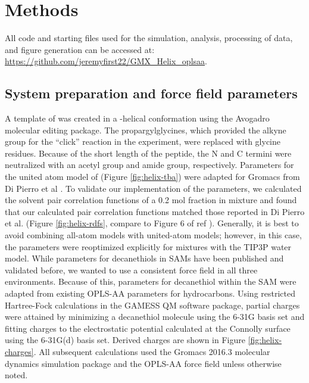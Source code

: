 \section{Methods}\label{helix-methods}

All code and starting files used for the simulation, analysis, processing of data, and figure generation can be accessed at: 
\url{https://github.com/jeremyfirst22/GMX_Helix_oplsaa}. 

\subsection{System preparation and force field parameters}

A template of \pep{} was created in a \textalpha{}-helical conformation using the Avogadro molecular editing package\cite{Hanwell2012}.
The propargylglycines, which provided the alkyne group for the ``click'' reaction in the experiment, were replaced with glycine residues. 
Because of the short length of the peptide, the N and C termini were neutralized with an acetyl group and amide group, respectively. 
Parameters for the united atom model of \tba{} (Figure \ref{fig:helix-tba}) were adapted for Gromacs from Di Pierro et al \cite{DiPierro2015}.
To validate our implementation of the \tba{} parameters, we calculated the solvent pair correlation functions of a 0.2 mol fraction \tba{} in  mixture and found that our calculated pair correlation functions matched those reported in Di Pierro et al. (Figure \ref{fig:helix-rdfs}, compare to Figure 6 of ref ). 
Generally, it is best to avoid combining all-atom models with united-atom models; 
however, in this case, the \tba{} parameters were reoptimized explicitly for mixtures with the TIP3P water model. 
While parameters for decanethiols in SAMs have been published and validated before\cite{Godawat2009}, we wanted to use a consistent force field in all three environments. 
Because of this, parameters for decanethiol within the SAM were adapted from existing OPLS-AA parameters for hydrocarbons\cite{Kaminski1994}. 
Using restricted Hartree-Fock calculations in the GAMESS QM software package\cite{Schmidt1993, Gordon2005}, partial charges were attained by minimizing a decanethiol molecule using the 6-31G basis set and fitting charges to the electrostatic potential calculated at the Connolly surface using the 6-31G(d) basis set. 
Derived charges are shown in Figure \ref{fig:helix-charges}. 
All subsequent calculations used the Gromacs 2016.3 molecular dynamics simulation package\cite{Berendsen1995, Lindahl2001, VanDerSpoel2005, Hess2008, Pronk2013, Pall2015, Abraham2015} and the OPLS-AA force field\cite{Jorgensen1996, Kaminski2001} unless otherwise noted.

